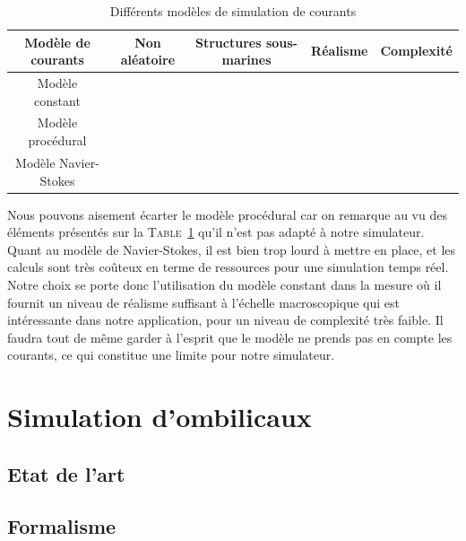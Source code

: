 				\begin{table}[ht]
					\centering
					\begin{adjustbox}{max width=\textwidth}
						\begin{tabular}{|c|c|c|c|c|}
							\hline
							\textbf{Modèle de courants} & \textbf{Non aléatoire} & \textbf{Structures sous-marines} & \textbf{Réalisme} & \textbf{Complexité} \\
							\hline
							Modèle constant & \cmark & \xmark & \pmark \pmark & \pmark\\
							\hline
							Modèle procédural & \xmark & \xmark & \pmark & \pmark \pmark \\
							\hline
							Modèle Navier-Stokes & \cmark & \cmark & \pmark \pmark \pmark & \pmark \pmark \pmark \\
							\hline
						\end{tabular}
					\end{adjustbox}
					\caption{Différents modèles de simulation de courants}
					\label{table:courants}
				\end{table}

				Nous pouvons aisement écarter le modèle procédural car on remarque au vu des éléments présentés sur la \textsc{Table}~\ref{table:courants} qu'il n'est pas adapté à notre simulateur. Quant au modèle de Navier-Stokes, il est bien trop lourd à mettre en place, et les calculs sont très coûteux en terme de ressources pour une simulation temps réel. Notre choix se porte donc l'utilisation du modèle constant dans la mesure où il fournit un niveau de réalisme suffisant à l'échelle macroscopique qui est intéressante dans notre application, pour un niveau de complexité très faible. Il faudra tout de même garder à l'esprit que le modèle ne prends pas en compte les courants, ce qui constitue une limite pour notre simulateur.

		\section{Simulation d'ombilicaux}

			\subsection{Etat de l'art}

			\subsection{Formalisme}

